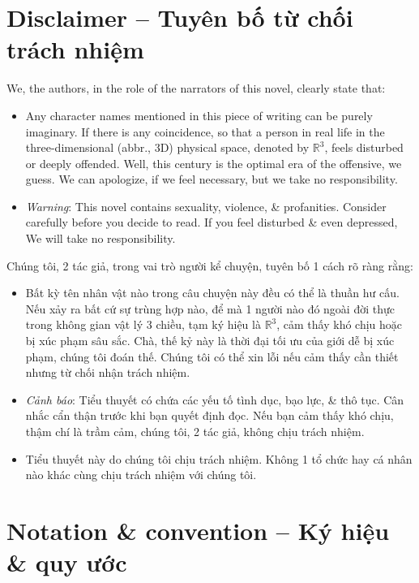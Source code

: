 \documentclass[12pt,twoside]{book}
\begin{document}
\section{Disclaimer -- Tuyên bố từ chối trách nhiệm}
We, the authors, in the role of the narrators of this novel, clearly state that:
\begin{itemize}
	\item Any character names mentioned in this piece of writing can be purely imaginary. If there is any coincidence, so that a person in real life in the three-dimensional (abbr., 3D) physical space, denoted by $\mathbb{R}^3$, feels disturbed or deeply offended. Well, this century is the optimal era of the offensive, we guess. We can apologize, if we feel necessary, but we take no responsibility.
	\item {\it Warning}: This novel contains sexuality, violence, \& profanities. Consider carefully before you decide to read. If you feel disturbed \& even depressed, We will take no responsibility.
\end{itemize}
Chúng tôi, 2 tác giả, trong vai trò người kể chuyện, tuyên bố 1 cách rõ ràng rằng:
\begin{itemize}
	\item Bất kỳ tên nhân vật nào trong câu chuyện này đều có thể là thuần hư cấu. Nếu xảy ra bất cứ sự trùng hợp nào, để mà 1 người nào đó ngoài đời thực trong không gian vật lý 3 chiều, tạm ký hiệu là $\mathbb{R}^3$, cảm thấy khó chịu hoặc bị xúc phạm sâu sắc. Chà, thế kỷ này là thời đại tối ưu của giới dễ bị xúc phạm, chúng tôi đoán thế. Chúng tôi có thể xin lỗi nếu cảm thấy cần thiết nhưng từ chối nhận trách nhiệm.
	\item {\it Cảnh báo}: Tiểu thuyết có chứa các yếu tố tình dục, bạo lực, \& thô tục. Cân nhắc cẩn thận trước khi bạn quyết định đọc. Nếu bạn cảm thấy khó chịu, thậm chí là trầm cảm, chúng tôi, 2 tác giả, không chịu trách nhiệm.
	\item Tiểu thuyết này do chúng tôi chịu trách nhiệm. Không 1 tổ chức hay cá nhân nào khác cùng chịu trách nhiệm với chúng tôi.
\end{itemize}

\section{Notation \& convention -- Ký hiệu \& quy ước}
\end{document}
